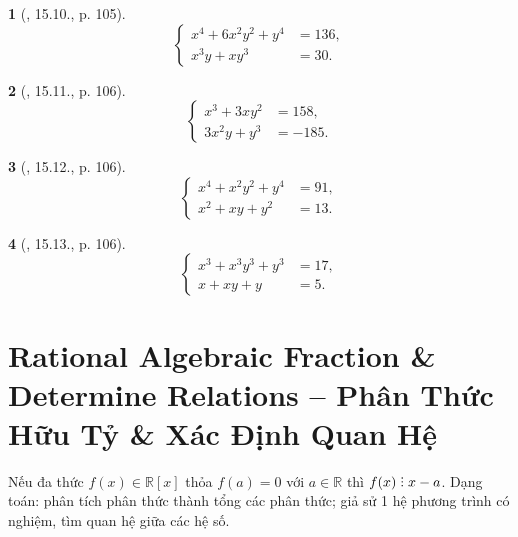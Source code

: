 \documentclass{article}
\newtheorem{baitoan}{}
\DeclareRobustCommand{\divby}{%
	\mathrel{\vbox{\baselineskip.65ex\lineskiplimit0pt\hbox{.}\hbox{.}\hbox{.}}}%
}
\begin{document}
\begin{baitoan}[\cite{TLCT_THCS_Toan_9_dai_so}, 15.10., p. 105]
	\begin{equation*}
		\left\{\begin{split}
			x^4 + 6x^2y^2 + y^4 &= 136,\\
			x^3y + xy^3 &= 30.
		\end{split}\right.
	\end{equation*}
\end{baitoan}

\begin{baitoan}[\cite{TLCT_THCS_Toan_9_dai_so}, 15.11., p. 106]
	\begin{equation*}
		\left\{\begin{split}
			x^3 + 3xy^2 &= 158,\\
			3x^2y + y^3 &= -185.
		\end{split}\right.
	\end{equation*}
\end{baitoan}

\begin{baitoan}[\cite{TLCT_THCS_Toan_9_dai_so}, 15.12., p. 106]
	\begin{equation*}
		\left\{\begin{split}
			x^4 + x^2y^2 + y^4 &= 91,\\
			x^2 + xy + y^2 &= 13.
		\end{split}\right.
	\end{equation*}
\end{baitoan}

\begin{baitoan}[\cite{TLCT_THCS_Toan_9_dai_so}, 15.13., p. 106]
	\begin{equation*}
		\left\{\begin{split}
			x^3 + x^3y^3 + y^3 &= 17,\\
			x + xy + y &= 5.
		\end{split}\right.
	\end{equation*}
\end{baitoan}


\section{Rational Algebraic Fraction \& Determine Relations -- Phân Thức Hữu Tỷ \& Xác Định Quan Hệ}
 Nếu đa thức $f(x)\in\mathbb{R}[x]$ thỏa $f(a) = 0$ với $a\in\mathbb{R}$ thì $f(x)\divby x - a$.  Dạng toán: phân tích phân thức thành tổng các phân thức; giả sử 1 hệ phương trình có nghiệm, tìm quan hệ giữa các hệ số.
\end{document}
